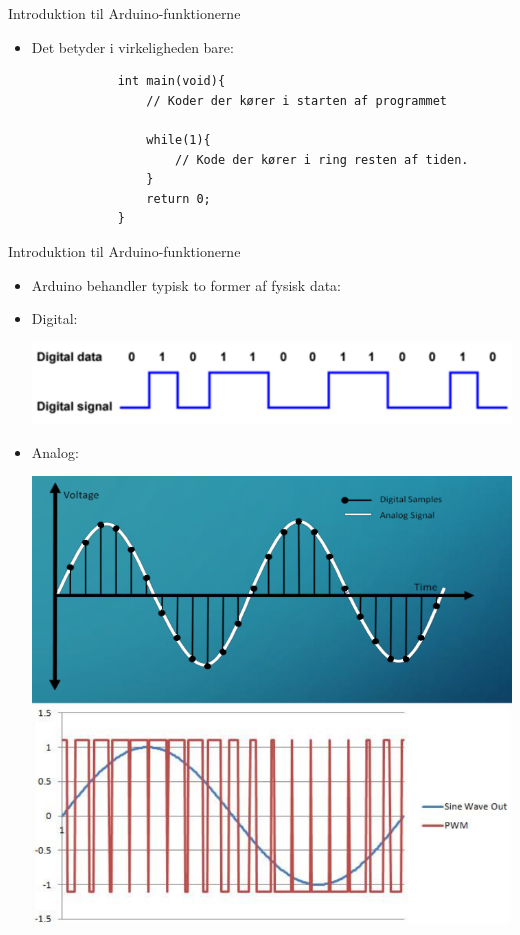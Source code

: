 \documentclass{beamer}
\begin{document}
\begin{frame}[fragile]{Introduktion til Arduino-funktionerne}
	\begin{itemize}
		\item{Det betyder i virkeligheden bare:}
		\begin{lstlisting}
			int main(void){
				// Koder der kører i starten af programmet
				
				while(1){
					// Kode der kører i ring resten af tiden.
				}
				return 0;
			}
		\end{lstlisting}
	\end{itemize}
\end{frame}

\begin{frame}[fragile]{Introduktion til Arduino-funktionerne}
	\begin{itemize}
		\item{Arduino behandler typisk to former af fysisk data:}
		\item{Digital:}
		\begin{center}
		\includegraphics[height=0.1\textheight]{assets/digital_data.png}
	\end{center}
		\item{Analog:}
		\begin{center}
		\includegraphics[height=0.7\textheight]{assets/analog_data.png}
	\end{center}
	\end{itemize}
\end{frame}
\end{document}
